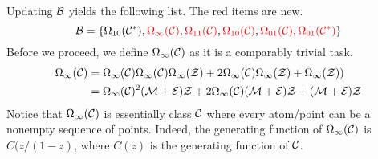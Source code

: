 \documentclass[12pt, a4paper, twoside]{report}
\begin{document}
Updating $\mathcal{B}$ yields the following list. The red items are new.
$$\mathcal{B} = \{\Omega_{10}(\mathcal{C}^*),\textcolor{red}{\Omega_\infty(\mathcal{C})}, \textcolor{red}{\Omega_{11}(\mathcal{C})},\textcolor{red}{\Omega_{10}(\mathcal{C})}, \textcolor{red}{\Omega_{01}(\mathcal{C})}, \textcolor{red}{\Omega_{01}(\mathcal{C}^*)}\}$$
Before we proceed, we define $\Omega_\infty(\mathcal{C})$ as it is a comparably trivial task.
\begin{align}
  \begin{aligned}
    \Omega_\infty(\mathcal{C}) &= \Omega_\infty(\mathcal{C})\Omega_\infty(\mathcal{C})\Omega_\infty(\mathcal{Z}) + 2\Omega_\infty(\mathcal{C})\Omega_\infty(\mathcal{Z}) + \Omega_\infty(\mathcal{Z}))\\
    &= \Omega_\infty(\mathcal{C})^2(\mathcal{M}+\mathcal{E})\mathcal{Z} + 2\Omega_\infty(\mathcal{C})(\mathcal{M}+\mathcal{E})\mathcal{Z} + (\mathcal{M}+\mathcal{E})\mathcal{Z}
  \end{aligned}
  \label{eq:omegainftyC}
\end{align}
Notice that $\Omega_\infty(\mathcal{C})$ is essentially class $\mathcal{C}$ where every atom/point can be a nonempty sequence of points. Indeed, the generating function of $\Omega_\infty(\mathcal{C})$ is $C(z/(1-z)$, where $C(z)$ is the generating function of $\mathcal{C}$.
\end{document}

